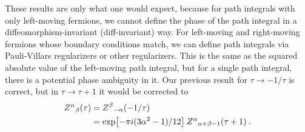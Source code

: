 	These results are only what one would expect, because for path integrals with only left-moving fermions, we cannot define the phase of the path integral in a diffeomorphism-invariant (diff-invariant) way. For left-moving and right-moving fermions whose boundary conditions match, we can define path integrals via Pauli-Villars regularizers or other regularizers. This is the same as the squared absolute value of the left-moving path integral, but for a single path integral, there is a potential phase ambiguity in it. Our previous result for $\tau\to-1/\tau$ is correct, but in $\tau\to\tau+1$ it would be corrected to
	\begin{align}
		Z^{\alpha}{}_{\beta}(\tau) &= Z^{\beta}{}_{-\alpha}(-1/\tau) \nonumber\\
		&= \exp[-\pi i(3\alpha^{2}-1)/12]\:Z^{\alpha}{}_{\alpha+\beta-1}(\tau+1)\:. \label{10.7.14}
	\end{align}
